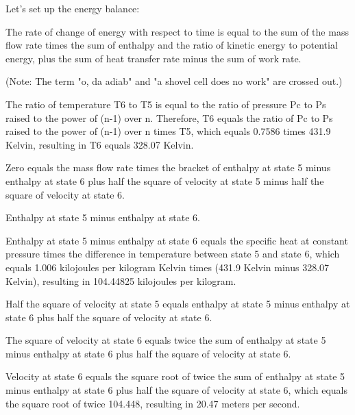 Let's set up the energy balance:

The rate of change of energy with respect to time is equal to the sum of the mass flow rate times the sum of enthalpy and the ratio of kinetic energy to potential energy, plus the sum of heat transfer rate minus the sum of work rate.

(Note: The term "o, da adiab" and "a shovel cell does no work" are crossed out.)

The ratio of temperature T6 to T5 is equal to the ratio of pressure Pc to Ps raised to the power of (n-1) over n. Therefore, T6 equals the ratio of Pc to Ps raised to the power of (n-1) over n times T5, which equals 0.7586 times 431.9 Kelvin, resulting in T6 equals 328.07 Kelvin.

Zero equals the mass flow rate times the bracket of enthalpy at state 5 minus enthalpy at state 6 plus half the square of velocity at state 5 minus half the square of velocity at state 6.

Enthalpy at state 5 minus enthalpy at state 6.

Enthalpy at state 5 minus enthalpy at state 6 equals the specific heat at constant pressure times the difference in temperature between state 5 and state 6, which equals 1.006 kilojoules per kilogram Kelvin times (431.9 Kelvin minus 328.07 Kelvin), resulting in 104.44825 kilojoules per kilogram.

Half the square of velocity at state 5 equals enthalpy at state 5 minus enthalpy at state 6 plus half the square of velocity at state 6.

The square of velocity at state 6 equals twice the sum of enthalpy at state 5 minus enthalpy at state 6 plus half the square of velocity at state 6.

Velocity at state 6 equals the square root of twice the sum of enthalpy at state 5 minus enthalpy at state 6 plus half the square of velocity at state 6, which equals the square root of twice 104.448, resulting in 20.47 meters per second.